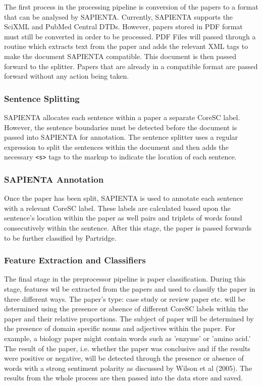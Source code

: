 The first process in the processing pipeline is conversion of the papers to a
format that can be analysed by SAPIENTA. Currently, SAPIENTA supports the
SciXML\cite{rupp2006flexible} and PubMed Central\cite{pubmedDTD} DTDs. However,
papers stored in PDF format must still be converted in order to be processed.
PDF Files will passed through a routine which extracts text from the paper and
adds the relevant XML tags to make the document SAPIENTA compatible. This
document is then passed forward to the splitter. Papers that are already in a
compatible format are passed forward without any action being taken.

\subsubsection{Sentence Splitting} 

SAPIENTA allocates each sentence within a paper a separate CoreSC label.
However, the sentence boundaries must be detected before the document is passed
into SAPIENTA for annotation. The sentence splitter uses a regular expression
to split the sentences within the document and then adds the necessary
\verb|<s>| tags to the markup to indicate the location of each sentence.

\subsubsection{SAPIENTA Annotation}

Once the paper has been split, SAPIENTA is used to annotate each sentence with
a relevant CoreSC label. These labels are calculated based upon the
sentence's location within the paper as well pairs and triplets of words found
consecutively within the sentence. After this stage, the paper is passed
forwards to be further classified by Partridge.


\subsubsection{Feature Extraction and Classifiers}

The final stage in the preprocessor pipeline is paper classification. During
this stage, features wil be extracted from the papers and used to classify the
paper in three different ways. The paper's type: case study or review paper
etc. will be determined using the presence or absence of different CoreSC labels
within the paper and their relative proportions. The subject of paper will be
determined by the presence of domain specific nouns and adjectives within the
paper. For example, a biology paper might contain words such as 'enzyme' or 'amino
acid.' The result of the paper, i.e. whether the paper was conclusive and if the
results were positive or negative, will be detected through the presence or absence
of words with a strong sentiment polarity as discussed by Wilson et al
(2005)\cite{Wilson05Polarity}. The results from the whole process are then
passed into the data store and saved.

